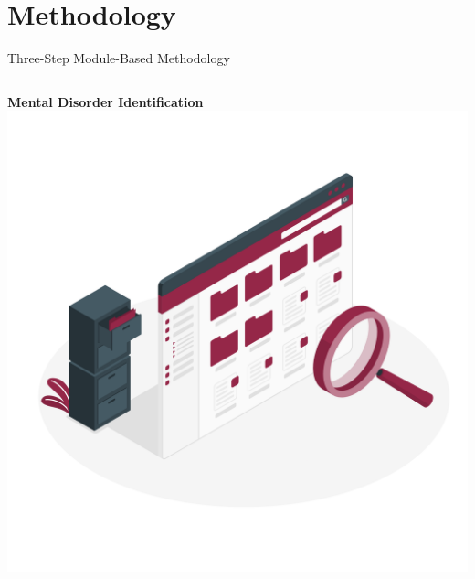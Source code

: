 \documentclass[10pt, xcolor=table]{beamer}
\begin{document}
\section*{Methodology}

\begin{frame}{Three-Step Module-Based Methodology}

	
	\vspace{0.5cm}
	
	\begin{columns}[c]
		\centering
		\textbf{Mental Disorder Identification} \\
		\includegraphics[width=\linewidth]{./figures/identification.png}
		

\end{columns}
\end{frame}
\end{document}
